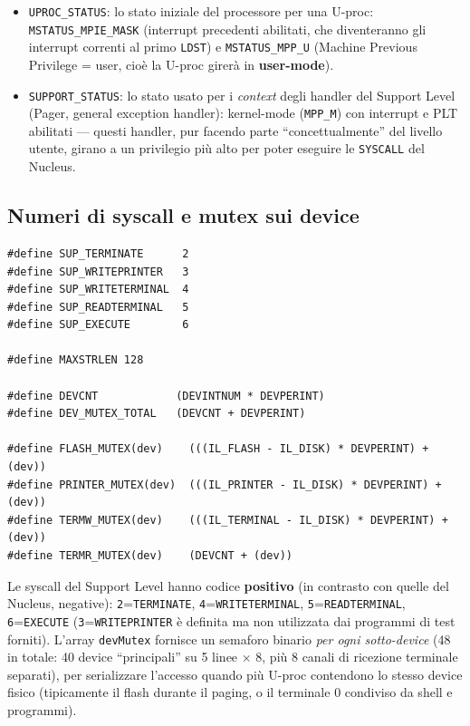 \documentclass[11pt,a4paper]{article}
\newcommand{\code}[1]{\texttt{#1}}
\begin{document}
\begin{itemize}
  risiede).
\item \code{UPROC\_STATUS}: lo stato iniziale del processore per una
  U-proc: \code{MSTATUS\_MPIE\_MASK} (interrupt precedenti abilitati, che
  diventeranno gli interrupt correnti al primo \code{LDST}) e
  \code{MSTATUS\_MPP\_U} (Machine Previous Privilege = user, cioè la U-proc
  girerà in \textbf{user-mode}).
\item \code{SUPPORT\_STATUS}: lo stato usato per i \emph{context} degli
  handler del Support Level (Pager, general exception handler): kernel-mode
  (\code{MPP\_M}) con interrupt e PLT abilitati --- questi handler, pur
  facendo parte ``concettualmente'' del livello utente, girano a un
  privilegio più alto per poter eseguire le \code{SYSCALL} del Nucleus.
\end{itemize}

\subsection{Numeri di syscall e mutex sui device}
\begin{lstlisting}
#define SUP_TERMINATE      2
#define SUP_WRITEPRINTER   3
#define SUP_WRITETERMINAL  4
#define SUP_READTERMINAL   5
#define SUP_EXECUTE        6

#define MAXSTRLEN 128

#define DEVCNT            (DEVINTNUM * DEVPERINT)
#define DEV_MUTEX_TOTAL   (DEVCNT + DEVPERINT)

#define FLASH_MUTEX(dev)    (((IL_FLASH - IL_DISK) * DEVPERINT) + (dev))
#define PRINTER_MUTEX(dev)  (((IL_PRINTER - IL_DISK) * DEVPERINT) + (dev))
#define TERMW_MUTEX(dev)    (((IL_TERMINAL - IL_DISK) * DEVPERINT) + (dev))
#define TERMR_MUTEX(dev)    (DEVCNT + (dev))
\end{lstlisting}
Le syscall del Support Level hanno codice \textbf{positivo} (in contrasto
con quelle del Nucleus, negative): \code{2}=\code{TERMINATE},
\code{4}=\code{WRITETERMINAL}, \code{5}=\code{READTERMINAL},
\code{6}=\code{EXECUTE} (\code{3}=\code{WRITEPRINTER} è definita ma non
utilizzata dai programmi di test forniti). L'array \code{devMutex} fornisce
un semaforo binario \emph{per ogni sotto-device} (48 in totale: 40 device
``principali'' su 5 linee $\times$ 8, più 8 canali di ricezione terminale
separati), per serializzare l'accesso quando più U-proc contendono lo
stesso device fisico (tipicamente il flash durante il paging, o il
terminale 0 condiviso da shell e programmi).
\end{document}
